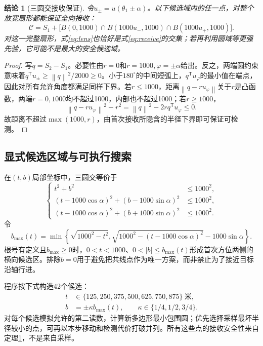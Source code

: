\documentclass[UTF8,fontset=fandol,a4paper,zihao=-4]{ctexart}
\newtheorem{theorem}{结论}
\newcommand{\norm}[1]{\left\lVert#1\right\rVert}
\begin{document}
\begin{theorem}[三圆交接收保证]\label{thm:lens}
令$u_\pm=u(\theta_1\pm\alpha)$。以下候选域内的任一点，对整个放宽扇形都能保证全向接收：
\begin{equation}\label{eq:lens}
\mathcal C=S_1+\bigl[B(0,1000)\cap B(1000u_-,1000)\cap B(1000u_+,1000)\bigr].
\end{equation}
对这一完整扇形，式\eqref{eq:lens}也恰好是式\eqref{eq:receive}的交集；若再利用圆域等更强先验，它可能不是最大的安全候选域。
\end{theorem}
\begin{proof}
写$q=S_2-S_1$。必要性由$r=0$和$r=1000,\varphi=\pm\alpha$给出。反之，两端圆约束意味着$q^\mathsf Tu_\pm\ge\norm q^2/2000\ge0$。小于$180^\circ$的中间短弧上，$q^\mathsf Tu_\varphi$的最小值在端点，因此对所有允许角度都满足同样下界。若$r\le1000$，距离$\norm{q-ru_\varphi}$关于$r$是凸函数，两端$r=0,1000$均不超过1000，内部也不超过1000；若$r\ge1000$，
\[
\norm{q-ru_\varphi}^2-r^2=\norm q^2-2r q^\mathsf Tu_\varphi\le0.
\]
故距离不超过$\max(1000,r)$，由首次接收所隐含的半径下界即可保证可检测。
\end{proof}

\subsection{显式候选区域与可执行搜索}
在$(t,b)$局部坐标中，三圆交等价于
\begin{equation}\label{eq:lenscoord}
\left\{\begin{aligned}
t^2+b^2&\le1000^2,\\
(t-1000\cos\alpha)^2+(b-1000\sin\alpha)^2&\le1000^2,\\
(t-1000\cos\alpha)^2+(b+1000\sin\alpha)^2&\le1000^2.
\end{aligned}\right.
\end{equation}
令
\begin{equation}
b_{\max}(t)=\min\left\{\sqrt{1000^2-t^2},\sqrt{1000^2-(t-1000\cos\alpha)^2}-1000\sin\alpha\right\}.
\end{equation}
根号有定义且$b_{\max}\ge0$时，$0<t<1000$、$0<|b|\le b_{\max}(t)$形成首次方位两侧的横向候选区。排除$b=0$用于避免把共线点作为唯一方案，而非禁止为了接近目标沿轴行进。

程序按下式构造42个候选：
\begin{equation}
\begin{aligned}
t&\in\{125,250,375,500,625,750,875\}\ \text{米},\\
b&=\pm\kappa b_{\max}(t),\qquad \kappa\in\{1/4,1/2,3/4\}.
\end{aligned}
\end{equation}
对每个候选模拟允许的第二读数，计算新多边形最小包围圆；优先选择采样最坏半径较小的点，可再以本步移动和检测代价打破并列。所有这些点的接收安全性来自定理\ref{thm:lens}，不是来自采样。
\end{document}
